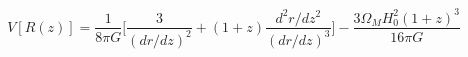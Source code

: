 \begin{equation}\label{vrecons}
V[R(z)]=\frac{1}{8\pi
G}\Big[\frac{3}{(dr/dz)^2}+(1+z)\frac{d^2r/dz^2}{(dr/dz)^3}
\Big]-\frac{3\Omega_M H_0^2(1+z)^3}{16\pi G}
\end{equation}

